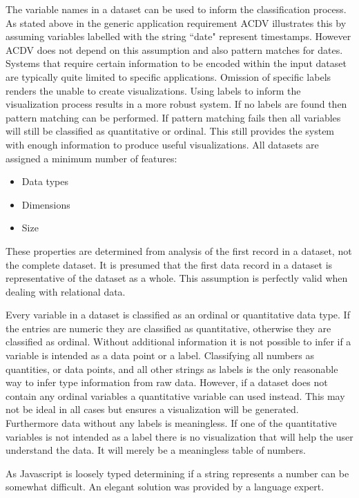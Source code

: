 \documentclass[a4paper, 11pt, titlepage, onehalfspacing]{report}
\begin{document}
The variable names in a dataset can be used to inform the classification process. As stated above in the generic application requirement AC\lightning{}DV illustrates this by assuming variables labelled with the string ``date" represent timestamps. However AC\lightning{}DV does not depend on this assumption and also pattern matches for dates. Systems that require certain information to be encoded within the input dataset are typically quite limited to specific applications. Omission of specific labels renders the unable to create visualizations. Using labels to inform the visualization process results in a more robust system. If no labels are found then pattern matching can be performed. If pattern matching fails then all variables will still be classified as quantitative or ordinal. This still provides the system with enough information to produce useful visualizations. All datasets are assigned a minimum number of features:
\begin{itemize}
\item Data types
\item Dimensions
\item Size
\end{itemize}
These properties are determined from analysis of the first record in a dataset, not the complete dataset. It is presumed that the first data record in a dataset is representative of the dataset as a whole. This assumption is perfectly valid when dealing with relational data.

Every variable in a dataset is classified as an ordinal or quantitative data type. If the entries are numeric they are classified as quantitative, otherwise they are classified as ordinal. Without additional information it is not possible to infer if a variable is intended as a data point or a label. Classifying all numbers as quantities, or data points, and all other strings as labels is the only reasonable way to infer type information from raw data. However, if a dataset does not contain any ordinal variables a quantitative variable can used instead. This may not be ideal in all cases but ensures a visualization will be generated. Furthermore data without any labels is meaningless. If one of the quantitative variables is not intended as a label there is no visualization that will help the user understand the data. It will merely be a meaningless table of numbers.

As Javascript is loosely typed determining if a string represents a number can be somewhat difficult. An elegant solution was provided by a language expert.
\end{document}
